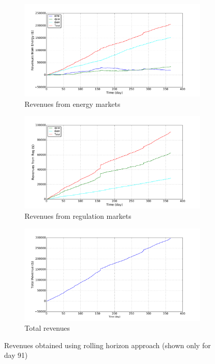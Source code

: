 \documentclass[11pt,twoside]{article}
\begin{document}
\begin{figure}[h!tp]
\centering
\begin{subfigure}[b]{0.49\textwidth} \includegraphics[width=\textwidth]{Figures/Plots/Horizon/Rev_E.pdf} \caption{Revenues from energy markets}\label{erevhor} \end{subfigure} \hfill
\begin{subfigure}[b]{0.49\textwidth} \includegraphics[width=\textwidth]{Figures/Plots/Horizon/Rev_Reg.pdf} \caption{Revenues from regulation markets}\label{regrevhor} \end{subfigure} \hfill
\begin{subfigure}[b]{0.49\textwidth} \includegraphics[width=\textwidth]{Figures/Plots/Horizon/Rev_Tot.pdf} \caption{Total revenues}\label{totrevhor}\end{subfigure} \hfill
\caption{Revenues obtained using rolling horizon approach (shown only for day 91)}\label{revhor}
\end{figure}
\end{document}
